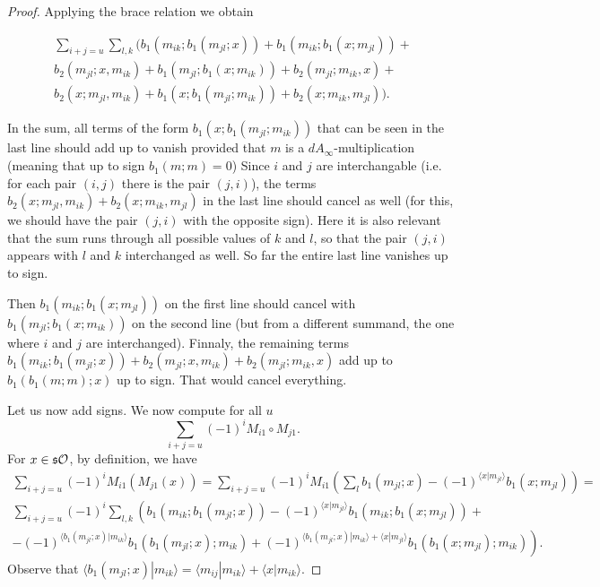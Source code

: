 \documentclass[twoside]{article}
\begin{document}
\begin{appendices}
\begin{proof}
Applying the brace relation we obtain

\begin{align*}
\sum_{i+j=u}\sum_{l,k}(b_1(m_{ik}; b_1(m_{jl};x))+b_1(m_{ik};b_1(x;m_{jl}))+\\
 b_2(m_{jl};x,m_{ik})+b_1(m_{jl};b_1(x;m_{ik}))+b_2(m_{jl};m_{ik},x)+\\
b_2(x;m_{jl},m_{ik})+b_1(x;b_1(m_{jl};m_{ik}))+b_2(x;m_{ik},m_{jl})).
\end{align*}

In the sum, all terms of the form $b_1(x;b_1(m_{jl};m_{ik}))$ that can be seen in the last line should add up to vanish provided that $m$ is a $dA_\infty$-multiplication (meaning that up to sign $b_1(m;m)=0$) %
 Since $i$ and $j$ are interchangable (i.e. for each pair $(i,j)$ there is the pair $(j,i)$), the terms $b_2(x;m_{jl},m_{ik})+b_2(x;m_{ik},m_{jl})$ in the last line should cancel as well (for this, we should have the pair $(j,i)$ with the opposite sign). Here it is also relevant that the sum runs through all possible values of $k$ and $l$, so that the pair $(j,i)$ appears with $l$ and $k$ interchanged as well. So far the entire last line vanishes up to sign.

Then $b_1(m_{ik};b_1(x;m_{jl}))$ on the first line should cancel with $b_1(m_{jl};b_1(x;m_{ik}))$ on the second line (but from a different summand, the one where $i$ and $j$ are interchanged). Finnaly, the remaining terms $b_1(m_{ik}; b_1(m_{jl};x))+b_2(m_{jl};x,m_{ik})+b_2(m_{jl};m_{ik},x)$ add up to $b_1(b_1(m;m);x)$ up to sign. That would cancel everything.



Let us now add signs. We now compute for all $u$
\[\sum_{i+j=u} (-1)^iM_{i1}\circ M_{j1}.\]
For $x\in\mathfrak{s}{\mathcal O}$, by definition, we have
\begin{align*}
\sum_{i+j=u}(-1)^iM_{i1}(M_{j1}(x))=\sum_{i+j=u}(-1)^iM_{i1}\left(\sum_l b_1(m_{jl};x)-(-1)^{\langle x|m_{jl}\rangle}b_1(x;m_{jl})\right)=\\
\sum_{i+j=u}(-1)^i\sum_{l,k}\left(b_1(m_{ik}; b_1(m_{jl};x))-(-1)^{\langle x|m_{jl}\rangle}b_1(m_{ik};b_1(x;m_{jl}))+\right.\\
\left. -(-1)^{\langle b_1(m_{jl};x)|m_{ik}\rangle}b_1(b_1(m_{jl};x);m_{ik})+(-1)^{\langle b_1(m_{jl};x)|m_{ik}\rangle+\langle x|m_{jl}\rangle}b_1(b_1(x;m_{jl});m_{ik})\right).
\end{align*}
Observe that $\langle b_1(m_{jl};x)|m_{ik}\rangle=\langle m_{ij}|m_{ik}\rangle+\langle x|m_{ik}\rangle$. %


\end{proof}
\end{appendices}
\end{document}
